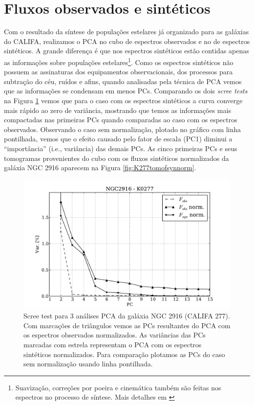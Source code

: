 \section{Fluxos observados e sintéticos}
\label{sec:PCAemIFS:OBSxSYN}

Com o resultado da síntese de populações estelares já organizado para as galáxias do CALIFA, realizamos o PCA no cubo de
espectros observados e no de espectros sintéticos. A grande diferença é que nos espectros sintéticos estão contidas
apenas as informações sobre populações estelares\footnote{Suavização, correções por poeira e cinemática também são
feitas nos espectros no processo de síntese. Mais detalhes em \citet{CidFernandes2005}}. Como os espectros sintéticos
não possuem as assinaturas dos equipamentos observacionais, dos processos para subtração do céu, ruídos e afins, quando
analisadas pela técnica de PCA vemos que as informações se condensam em menos PCs. Comparando os dois {\em scree tests}
na Figura \ref{fig:K0277scree} vemos que para o caso com os espectros sintéticos a curva converge mais rápido ao
zero de variância, mostrando que temos as informações mais compactadas nas primeiras PCs quando comparadas ao caso com
os espectros observados. Observando o caso sem normalização, plotado no gráfico com linha pontilhada, vemos que o efeito
causado pelo fator de escala (PC1) diminui a ``importância'' (i.e., variância) das demais PCs. As cinco primeiras PCs e
seus tomogramas provenientes do cubo com os fluxos sintéticos normalizados da galáxia NGC 2916 aparecem na Figura
\ref{fig:K277tomofsynnorm}.

\begin{figure}
    \includegraphics[width=1.\textwidth]{figuras/K0277-screetest.pdf}
    \caption[Scree test comparativo entre 3 PCAs.]
    {Scree test para 3 análises PCA da galáxia NGC 2916 (CALIFA 277). Com marcações de triângulos vemos as PCs
    resultantes do PCA com os espectros observados normalizados. As variâncias das PCs marcadas com estrela representam
    o PCA com os espectros sintéticos normalizados. Para comparação plotamos as PCs do caso sem normalização usando
    linha pontilhada.}
    \label{fig:K0277scree}
\end{figure}

